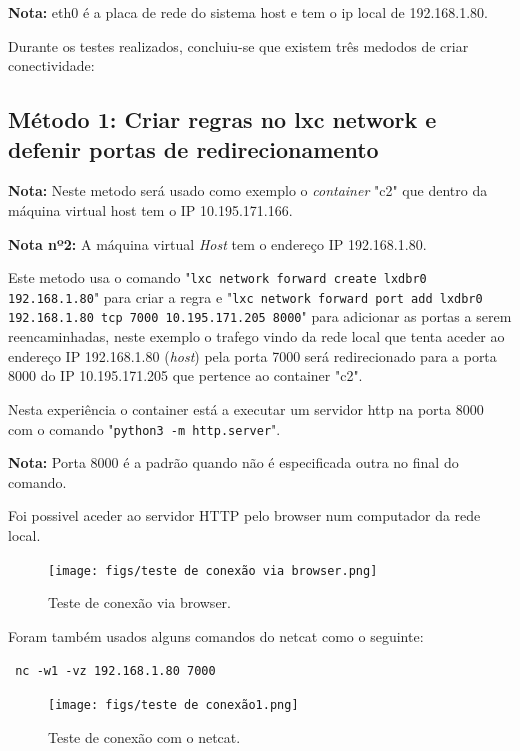 \textbf{Nota:} eth0 é a placa de rede do sistema host e tem o ip local de 192.168.1.80.


Durante os testes realizados, concluiu-se que existem três medodos de criar conectividade:

\subsection{Método 1: Criar regras no lxc network e defenir portas de redirecionamento}

\textbf{Nota:} Neste metodo será usado como exemplo o \textit{container} "c2" que
dentro da máquina virtual host tem o IP 10.195.171.166.

\textbf{Nota nº2:} A máquina virtual \textit{Host} tem o endereço IP 192.168.1.80.

Este metodo usa o comando "\texttt{lxc network forward create lxdbr0 192.168.1.80}"
para criar a regra e "\texttt{lxc network forward port add lxdbr0 192.168.1.80 tcp 7000 10.195.171.205 8000}"
para adicionar as portas a serem reencaminhadas, neste exemplo o trafego vindo da
rede local que tenta aceder ao endereço IP 192.168.1.80 (\textit{host}) pela porta 7000 será redirecionado
para a porta 8000 do IP 10.195.171.205 que pertence ao container "c2".

Nesta experiência o container está a executar um servidor http na porta 8000
com o comando "\texttt{python3 -m http.server}".


\textbf{Nota:} Porta 8000 é a padrão quando não é especificada outra no final do comando.


Foi possivel aceder ao servidor HTTP pelo browser num computador da rede local.

\begin{figure}[H]
\begin{center}
\texttt{[image: figs/teste de conexão via browser.png]}
\caption{Teste de conexão via browser.}
\label{fig:bookstack}
\end{center}
\end{figure}


Foram também usados alguns comandos do netcat como o seguinte: %

\begin{tcolorbox}[colback=blue!5!white,colframe=blue!75!black]
    \verb | nc -w1 -vz 192.168.1.80 7000 |
\end{tcolorbox} 


\begin{figure}[ht]
\begin{center}
\texttt{[image: figs/teste de conexão1.png]}
\caption{Teste de conexão com o netcat.}
\label{fig:bookstack}
\end{center}
\end{figure}

